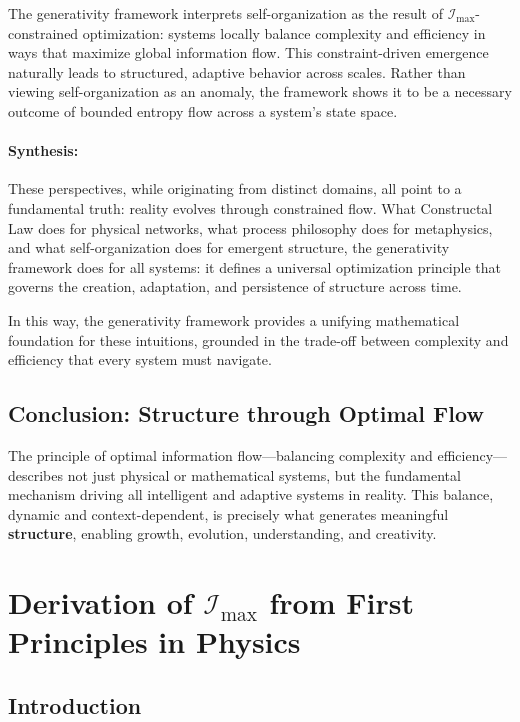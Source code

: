 \documentclass[12pt]{article}
\begin{document}
The generativity framework interprets self-organization as the result of \(\mathcal{I}_{\text{max}}\)-constrained optimization: systems locally balance complexity and efficiency in ways that maximize global information flow. This constraint-driven emergence naturally leads to structured, adaptive behavior across scales. Rather than viewing self-organization as an anomaly, the framework shows it to be a necessary outcome of bounded entropy flow across a system’s state space.

\paragraph{Synthesis:}
These perspectives, while originating from distinct domains, all point to a fundamental truth: reality evolves through constrained flow. What Constructal Law does for physical networks, what process philosophy does for metaphysics, and what self-organization does for emergent structure, the generativity framework does for all systems: it defines a universal optimization principle that governs the creation, adaptation, and persistence of structure across time.

In this way, the generativity framework provides a unifying mathematical foundation for these intuitions, grounded in the trade-off between complexity and efficiency that every system must navigate.

\subsection{Conclusion: Structure through Optimal Flow}
The principle of optimal information flow—balancing complexity and efficiency—describes not just physical or mathematical systems, but the fundamental mechanism driving all intelligent and adaptive systems in reality. This balance, dynamic and context-dependent, is precisely what generates meaningful \textbf{structure}, enabling growth, evolution, understanding, and creativity.


\section{Derivation of \(\mathcal{I}_{\text{max}}\) from First Principles in Physics}


\subsection{Introduction}
\end{document}
